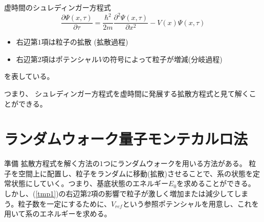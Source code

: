 \documentclass[dvipdfmx]{beamer}
\begin{document}
    \begin{frame}

        \begin{block}{虚時間のシュレディンガー方程式}
            \begin{equation}
                \label{tmp1}
        \dfrac{\partial \Psi(x,\tau)}{\partial \tau} = \dfrac{\hbar^2}{2m}\dfrac{\partial^2 \Psi(x,\tau)}{\partial x^2} - V(x)\Psi(x,\tau)
            \end{equation}
        \end{block}

        \begin{itemize}
            \item 右辺第$1$項は粒子の拡散 (拡散過程)
            \item 右辺第$2$項はポテンシャル$V$の符号によって粒子が増減(分岐過程)
        \end{itemize}

        を表している。

        つまり、
        \alert{シュレディンガー方程式を虚時間に発展する拡散方程式と見て解くことができる。}
    \end{frame}


    \section{ランダムウォーク量子モンテカルロ法}
    \begin{frame}{準備}
        拡散方程式を解く方法の$1$つにランダムウォークを用いる方法がある。
        粒子を空間上に配置し、粒子をランダムに移動(拡散)させることで、系の状態を定常状態にしていく。つまり、基底状態のエネルギー$E_0$を求めることができる。
        \vfill
        しかし、(\ref{tmp1})の右辺第$2$項の影響で粒子が激しく増加または減少してしまう。粒子数を一定にするために、$V_{ref}$という参照ポテンシャルを用意し、これを用いて系のエネルギーを求める。
    \end{frame}
\end{document}
